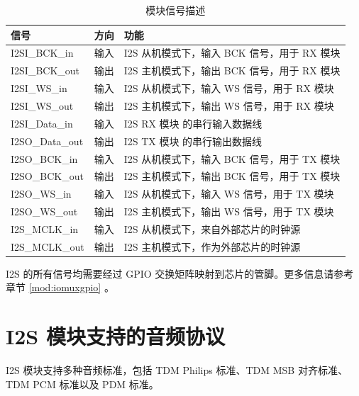 \documentclass[main\_\_CN.tex]{subfiles}
\begin{document}
\begin{table}[H]
    \centering
    \caption{模块信号描述}
    \label{tab:i2s-signal-descr}
    \begin{tabular}{|p{3cm}|p{1.5cm}|p{8cm}| }
    \hline
    \rowcolor{lightgray}
    \textbf{信号}&\textbf{方向}&\textbf{功能}\\
    \hline
    I2SI\_BCK\_in & 输入 & I2S 从机模式下，输入 BCK 信号，用于 RX 模块\\
    \hline
    I2SI\_BCK\_out& 输出 & I2S 主机模式下，输出 BCK 信号，用于 RX 模块\\
    \hline
    I2SI\_WS\_in & 输入 & I2S 从机模式下，输入 WS 信号，用于 RX 模块\\
    \hline
    I2SI\_WS\_out& 输出 & I2S 主机模式下，输出 WS 信号，用于 RX 模块\\\hline
    I2SI\_Data\_in& 输入 & I2S RX 模块 的串行输入数据线\\\hline
    I2SO\_Data\_out& 输出 & I2S TX 模块 的串行输出数据线\\\hline
    I2SO\_BCK\_in& 输入 & I2S 从机模式下，输入 BCK 信号，用于 TX 模块 \\\hline
    I2SO\_BCK\_out& 输出 & I2S 主机模式下，输出 BCK 信号，用于 TX 模块 \\\hline
    I2SO\_WS\_in& 输入 & I2S 从机模式下，输入 WS 信号，用于 TX 模块\\\hline
    I2SO\_WS\_out& 输出 & I2S 主机模式下，输出 WS 信号，用于 TX 模块\\\hline
    I2S\_MCLK\_in& 输入 & I2S 从机模式下，来自外部芯片的时钟源\\\hline
    I2S\_MCLK\_out& 输出 & I2S 主机模式下，作为外部芯片的时钟源\\\hline
    \end{tabular}
\end{table}

\vspace{-0.5em}
\begin{tiplisting}
I2S 的所有信号均需要经过 GPIO 交换矩阵映射到芯片的管脚。更多信息请参考章节 \ref{mod:iomuxgpio} \textit{}。
\end{tiplisting}



\section{I2S 模块支持的音频协议} \label{sec:i2s-supported-audio-standards}

\chipname{} I2S 模块支持多种音频标准，包括 TDM Philips 标准、TDM MSB 对齐标准、TDM PCM 标准以及 PDM 标准。
\end{document}
